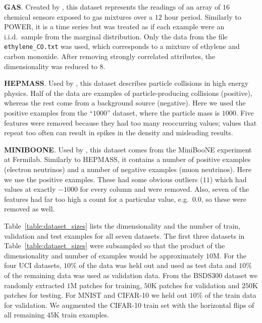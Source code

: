 \textbf{GAS}. Created by \citet{Fonollosa:2015}, this dataset represents the readings of an array of $16$ chemical sensors exposed to gas mixtures over a $12$ hour period. Similarly to POWER, it is a time series but was treated as if each example were an i.i.d.~sample from the marginal distribution. Only the data from the file \texttt{ethylene\_CO.txt} was used, which corresponds to a mixture of ethylene and carbon monoxide. After removing strongly correlated attributes, the dimensionality was reduced to $8$.

\textbf{HEPMASS}. Used by \citet{Baldi:2016}, this dataset describes particle collisions in high energy physics. Half of the data are examples of particle-producing collisions (positive), whereas the rest come from a background source (negative). Here we used the positive examples from the ``$1000$'' dataset, where the particle mass is $1000$. Five features were removed because they had too many reoccurring values; values that repeat too often can result in spikes in the density and misleading results.

\textbf{MINIBOONE}. Used by \citet{Roe:2005}, this dataset comes from the MiniBooNE experiment at Fermilab. Similarly to HEPMASS, it contains a number of positive examples (electron neutrinos) and a number of negative examples (muon neutrinos). Here we use the positive examples. These had some obvious outliers ($11$) which had values at exactly $-1000$ for every column and were removed. Also, seven of the features had far too high a count for a particular value, e.g.~$0.0$, so these were removed as well.


Table~\ref{table:dataset_sizes} lists the dimensionality and the number of train, validation and test examples for all seven datasets. The first three
datasets in Table~\ref{table:dataset_sizes} were subsampled so that the product of the dimensionality and number of examples would be approximately $10\mathrm{M}$. For the four UCI datasets, $10\%$ of the data was held out and used as test data and $10\%$ of the remaining data was used as validation data. From the BSDS300 dataset we randomly extracted $1\mathrm{M}$ patches for training, $50\mathrm{K}$ patches for validation and $250\mathrm{K}$ patches for testing. For MNIST and CIFAR-10 we held out $10\%$ of the train data for validation. We augmented the CIFAR-10 train set with the horizontal flips of all remaining $45\mathrm{K}$ train examples.

